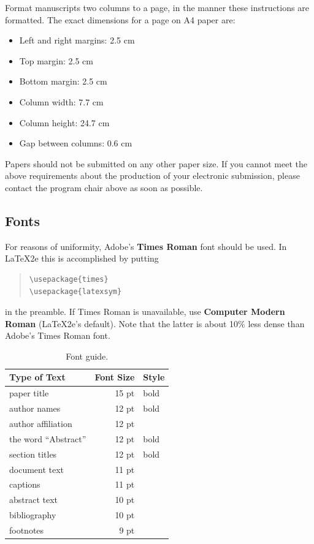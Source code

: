 \documentclass[11pt]{article}
\begin{document}
Format manuscripts two columns to a page, in the manner these
instructions are formatted. The exact dimensions for a page on A4
paper are:

\begin{itemize}
\item Left and right margins: 2.5 cm
\item Top margin: 2.5 cm
\item Bottom margin: 2.5 cm
\item Column width: 7.7 cm
\item Column height: 24.7 cm
\item Gap between columns: 0.6 cm
\end{itemize}

\noindent Papers should not be submitted on any other paper size.
 If you cannot meet the above requirements about the production of your electronic submission, 
please contact the program chair above as soon as possible.

\subsection{Fonts}
\label{ssec:fonts}
For reasons of uniformity, Adobe's {\bf Times Roman} font should be
used. In \LaTeX2e{} this is accomplished by putting

\begin{quote}
\begin{verbatim}
\usepackage{times}
\usepackage{latexsym}
\end{verbatim}
\end{quote}
in the preamble. If Times Roman is unavailable, use {\bf Computer
  Modern Roman} (\LaTeX2e{}'s default).  Note that the latter is about
  10\% less dense than Adobe's Times Roman font.


\begin{table}[h]
\begin{center}
\begin{tabular}{|l|rl|}
\hline \bf Type of Text & \bf Font Size & \bf Style \\ \hline
paper title & 15 pt & bold \\
author names & 12 pt & bold \\
author affiliation & 12 pt & \\
the word ``Abstract'' & 12 pt & bold \\
section titles & 12 pt & bold \\
document text & 11 pt  &\\
captions & 11 pt & \\
abstract text & 10 pt & \\
bibliography & 10 pt & \\
footnotes & 9 pt & \\
\hline
\end{tabular}
\end{center}
\caption{\label{font-table} Font guide. }
\end{table}
\end{document}
